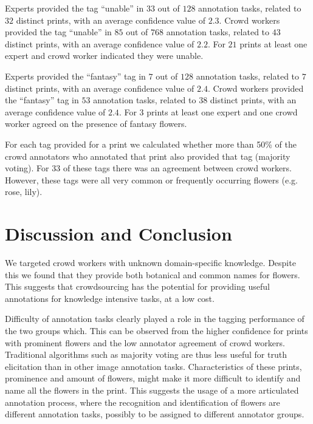 \documentclass{sig-alternate-2013}
\begin{document}
Experts provided the tag ``unable'' in $33$ out of $128$ annotation tasks, related to $32$ distinct prints, with an average confidence value of $2.3$.  Crowd workers provided the tag ``unable'' in $85$ out of $768$ annotation tasks, related to $43$ distinct prints, with an average confidence value of $2.2$. For $21$ prints at least one expert and crowd worker indicated they were unable.

Experts provided the ``fantasy'' tag in $7$ out of $128$ annotation tasks, related to $7$ distinct prints, with an average confidence value of $2.4$. 
Crowd workers provided the ``fantasy'' tag in $53$ annotation tasks, related to $38$ distinct prints, with an average confidence value of $2.4$. For $3$ prints at least one expert and one crowd worker agreed on the presence of fantasy flowers.

For each tag provided for a print we calculated whether more than 50\% of the crowd annotators who annotated that print also provided that tag (majority voting). 
For 33 of these tags there was an agreement between crowd workers. However, these tags were all very common or frequently occurring flowers (e.g. rose, lily).

\section{Discussion and Conclusion}
We targeted crowd workers with unknown domain-specific knowledge. Despite this we found that they provide both botanical and common names for flowers. This suggests that crowdsourcing has the potential for providing useful annotations for knowledge intensive tasks, at a low cost.

Difficulty of annotation tasks clearly played a role in the tagging performance of the two groups which. This can be observed from the higher confidence for prints with prominent flowers and the low annotator agreement of crowd workers. Traditional algorithms such as majority voting are thus less useful for truth elicitation than in other image annotation tasks. Characteristics of these prints, prominence and amount of flowers, might make it more difficult to identify and name all the flowers in the print. This suggests the usage of a more articulated annotation process, where the recognition and identification of flowers are different annotation tasks, possibly to be assigned to different annotator groups. 

\vspace{5mm}
\end{document}
